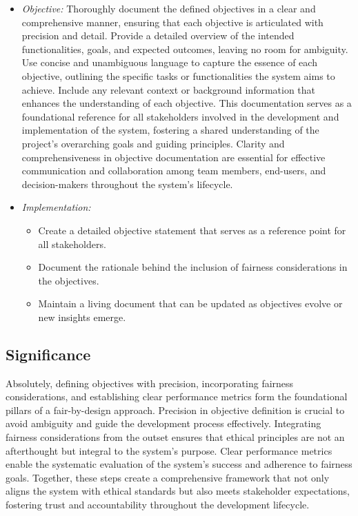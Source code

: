 \documentclass[12pt,a4paper,openright,twoside]{book}
\begin{document}
\begin{itemize}

    \item \emph{Objective:} Thoroughly document the defined objectives in a clear and comprehensive manner, ensuring that each objective is articulated with precision and detail. Provide a detailed overview of the intended functionalities, goals, and expected outcomes, leaving no room for ambiguity. Use concise and unambiguous language to capture the essence of each objective, outlining the specific tasks or functionalities the system aims to achieve. Include any relevant context or background information that enhances the understanding of each objective. This documentation serves as a foundational reference for all stakeholders involved in the development and implementation of the system, fostering a shared understanding of the project's overarching goals and guiding principles. Clarity and comprehensiveness in objective documentation are essential for effective communication and collaboration among team members, end-users, and decision-makers throughout the system's lifecycle.

    \item \emph{Implementation:}

        \begin{itemize}

            \item Create a detailed objective statement that serves as a reference point for all stakeholders.

            \item Document the rationale behind the inclusion of fairness considerations in the objectives.

            \item Maintain a living document that can be updated as objectives evolve or new insights emerge.

        \end{itemize}

\end{itemize}

\subsection{Significance}

Absolutely, defining objectives with precision, incorporating fairness considerations, and establishing clear performance metrics form the foundational pillars of a fair-by-design approach. Precision in objective definition is crucial to avoid ambiguity and guide the development process effectively. Integrating fairness considerations from the outset ensures that ethical principles are not an afterthought but integral to the system's purpose. Clear performance metrics enable the systematic evaluation of the system's success and adherence to fairness goals. Together, these steps create a comprehensive framework that not only aligns the system with ethical standards but also meets stakeholder expectations, fostering trust and accountability throughout the development lifecycle.
\end{document}
